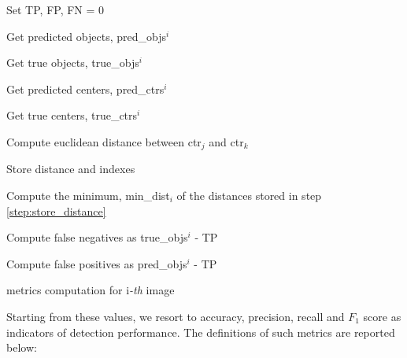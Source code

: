\begin{algorithm}%
    \DontPrintSemicolon
    
    Set TP, FP, FN = 0
    
    Get predicted objects, pred\_objs$^i$
    
    Get true objects, true\_objs$^i$
    
    Get predicted centers, pred\_ctrs$^i$
    
    Get true centers, true\_ctrs$^i$
    
        {
            {
            
             Compute euclidean distance between ctr$_j$ and ctr$_k$ \label{step:ctrs_distance}
             
             Store distance and indexes
             \label{step:store_distance}
            } 
        
         Compute the minimum, min\_dist$_i$ of the distances stored in step \ref{step:store_distance}
         
        
        }
        
    Compute false negatives as true\_objs$^i$ - TP
    
    Compute false positives as pred\_objs$^i$ - TP
    
\caption{metrics computation for i\emph{-th} image}
\label{algo:pseudocode_metrics}
\end{algorithm}
Starting from these values, we resort to accuracy, precision, recall and $F_1$ score as indicators of detection performance.
The definitions of such metrics are reported below:

